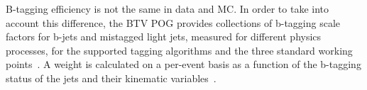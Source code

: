 B-tagging efficiency is not the same in data and MC. In order to take into account this difference, the BTV POG provides collections of b-tagging scale factors for b-jets and mistagged light jets, measured for different physics processes, for the supported tagging algorithms and the three standard working points~\cite{bib:btag}. A weight is calculated on a per-event basis as a function of the b-tagging status of the jets and their kinematic variables~\cite{bib:btagsf}.%
% 
% 
%   
% 
% 

